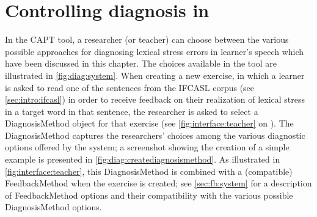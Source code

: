 %

\section{Controlling diagnosis in }
\label{sec:diag:system}

	In the  CAPT tool, a  researcher (or teacher) can choose between the various possible approaches for diagnosing lexical stress errors in learner's speech which have been discussed in this chapter. The choices available in the tool are illustrated in \cref{fig:diag:system}. When creating a new exercise, in which a learner is asked to read one of the sentences from the IFCASL corpus (see \cref{sec:intro:ifcasl}) in order to receive feedback on their realization of lexical stress in a target word in that sentence, the researcher is asked to select a DiagnosisMethod object for that exercise (see \cref{fig:interface:teacher} on ). The DiagnosisMethod captures the researchers' choices among the various diagnostic options offered by the system; a screenshot showing the creation of a simple example is presented in \cref{fig:diag:creatediagnosismethod}. As illustrated in \cref{fig:interface:teacher}, this DiagnosisMethod is combined with a (compatible) FeedbackMethod when the exercise is created; see \cref{sec:fb:system} for a description of FeedbackMethod options and their compatibility with the various possible DiagnosisMethod options. 
	
